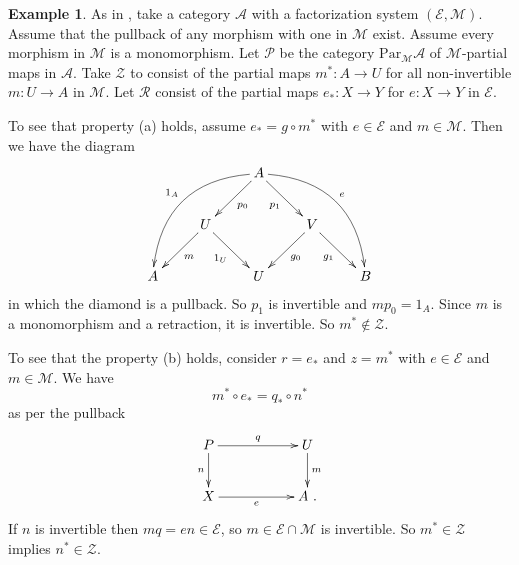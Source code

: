 \documentclass[a4paper,12pt,reqno]{amsart}
\theoremstyle{definition}
\newtheorem{example}[theorem]{Example}
\theoremstyle{fact}
\theoremstyle{genquest}
\theoremstyle{step}
\newcommand{\lra}{\longrightarrow}
\def\CA{{\mathscr A}}
\def\CE{{\mathscr E}}
\def\CM{{\mathscr M}}
\def\CP{{\mathscr P}}
\def\CR{{\mathscr R}}
\def\CZ{{\mathscr Z}}
\begin{document}
\begin{example}\label{Ex1} As in \cite{PMSE}, take a category $\CA$ with a factorization system $(\CE,\CM)$. Assume that the pullback of any 
morphism with one in $\CM$ exist. Assume every morphism in $\CM$
is a monomorphism. Let $\CP$ be the category 
$\mathrm{Par}_{\CM}\CA$ of $\CM$-partial maps in $\CA$.
Take $\CZ$ to consist of the partial maps $m^*:A \lra U$ for
all non-invertible $m : U \lra A$ in $\CM$.
Let $\CR$ consist of the partial maps $e_* : X \lra Y$ 
for $e : X \lra Y$ in $\CE$.  

To see that property (a) holds, assume $e_* = g\circ m^*$ with 
$e\in \CE$ and $m\in \CM$. Then we have the diagram
\begin{equation}\label{pmcomp}
\begin{aligned}
\xymatrix{
& & A \ar[ld]^-{p_0} \ar@/_2pc/[lldd]_-{1_A} \ar[rd]_-{p_1} \ar@/^2pc/[rrdd]^-{e} \\
& U \ar[ld]^-{m} \ar[rd]_-{1_U} & & V \ar[rd]_-{g_1} \ar[ld]^-{g_0} \\
A & & U & & B}
\end{aligned}
\end{equation}
in which the diamond is a pullback. So $p_1$ is invertible and 
$mp_0=1_A$. Since $m$ is a monomorphism and a retraction, it is invertible.
So $m^*\notin \CZ$.

To see that the property (b) holds, consider $r = e_*$ and $z = m^*$
with $e\in \CE$ and $m\in \CM$. We have 
$$m^*\circ e_* = q_*\circ n^*$$ 
as per the pullback
\begin{equation}\label{ExAx2}
\begin{aligned}
\xymatrix{
P \ar[rr]^-{q} \ar[d]_-{n} && U \ar[d]^-{m} \\
X \ar[rr]_-{e} && A \ .}
\end{aligned}
\end{equation}
If $n$ is invertible then $mq=en\in \CE$, so $m\in \CE \cap \CM$
is invertible. So $m^*\in \CZ$ implies $n^*\in \CZ$.
\end{example}
\end{document}
